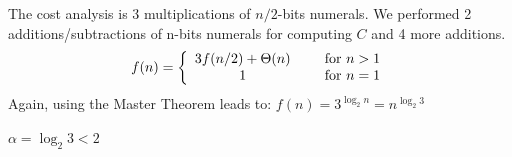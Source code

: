 \begin{itemize}
\begin{enumerate}
The cost analysis is 3 multiplications of $n/2$-bits numerals.
We performed 2 additions/subtractions of n-bits numerals for computing $C$ and
4 more additions. 
\[
f(n) = \left\{
\begin{array}{cl}
3 f(n/2) + \Theta(n) & \hspace*{.2in} \mbox{for } n > 1 \\
                    1 & \hspace*{.2in} \mbox{for } n = 1
\end{array}
\right. 
\]
Again, using the Master Theorem leads to:
$f(n) = 3^{\log_2 n} = n^{\log_2 3}$

$\alpha = \log_2 3 < 2$
\end{enumerate}

\end{itemize}


%
%
%
%
%



